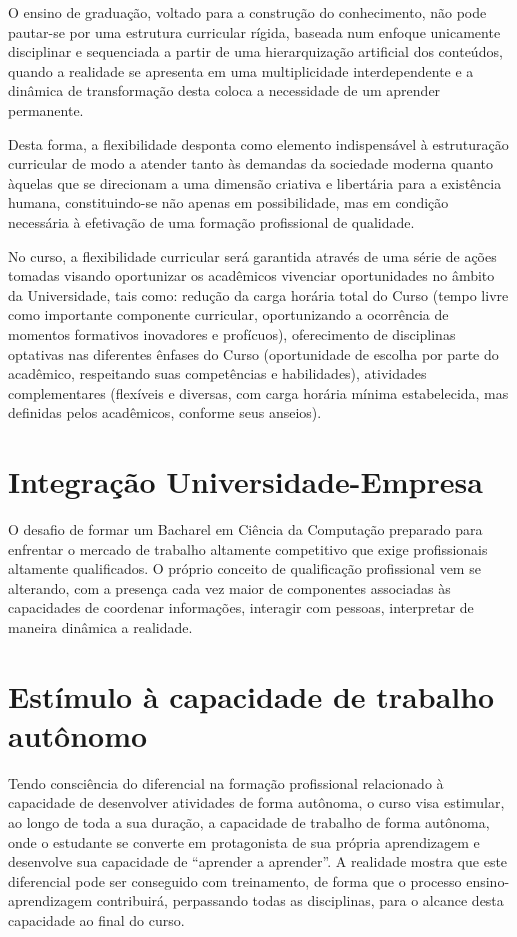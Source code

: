 \documentclass[
	12pt,				%
	openright,			%
  oneside,     %
	a4paper,			%
	english,			%
	french,				%
	spanish,			%
	brazil				%
	]{abntex2}
\begin{document}
O ensino de graduação, voltado para a construção do
conhecimento, não pode pautar-se por uma estrutura curricular rígida, baseada
num enfoque unicamente disciplinar e sequenciada a partir de uma hierarquização
artificial dos conteúdos, quando a realidade se apresenta em uma multiplicidade
interdependente e a dinâmica de transformação desta coloca a necessidade de um
aprender permanente. 

Desta forma, a flexibilidade desponta como elemento
indispensável à estruturação curricular de modo a atender tanto às demandas da
sociedade moderna quanto àquelas que se direcionam a uma dimensão criativa e
libertária para a existência humana, constituindo-se não apenas em
possibilidade, mas em condição necessária à efetivação de uma formação
profissional de qualidade. 

No curso, a flexibilidade curricular será garantida
através de uma série de ações tomadas visando oportunizar os acadêmicos
vivenciar oportunidades no âmbito da Universidade, tais como: redução da carga
horária total do Curso (tempo livre como importante componente curricular,
oportunizando a ocorrência de momentos formativos inovadores e profícuos),
oferecimento de disciplinas optativas nas diferentes ênfases do Curso
(oportunidade de escolha por parte do acadêmico, respeitando suas competências e
habilidades), atividades complementares (flexíveis e diversas, com carga horária
mínima estabelecida, mas definidas pelos acadêmicos, conforme seus anseios). 

\section{Integração Universidade-Empresa}

O desafio de formar um Bacharel em Ciência  da Computação preparado para
enfrentar o mercado de trabalho altamente  competitivo que exige profissionais
altamente qualificados. O próprio conceito  de qualificação profissional vem se
alterando, com a presença cada vez maior de  componentes associadas às
capacidades de coordenar informações, interagir  com pessoas, interpretar de
maneira dinâmica a realidade.

\section{Estímulo à capacidade de trabalho autônomo}

Tendo consciência do diferencial na formação  profissional relacionado à
capacidade de desenvolver atividades de forma  autônoma, o curso visa estimular,
ao longo de toda a sua duração, a capacidade de  trabalho de forma autônoma,
onde o estudante se converte em protagonista de  sua própria aprendizagem e
desenvolve sua capacidade de ``aprender a aprender''.  A realidade mostra que
este diferencial pode ser conseguido com treinamento, de forma que o processo
ensino-aprendizagem contribuirá, perpassando todas as disciplinas, para o
alcance desta capacidade ao final do curso.
\end{document}
